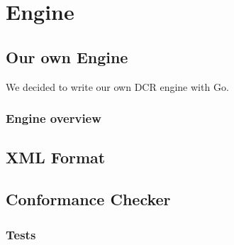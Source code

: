 \section*{Engine}

\subsection*{Our own Engine}
We decided to write our own DCR engine with Go.

\subsubsection*{Engine overview}

\subsection*{XML Format}

\subsection*{Conformance Checker}
\subsubsection*{Tests}
